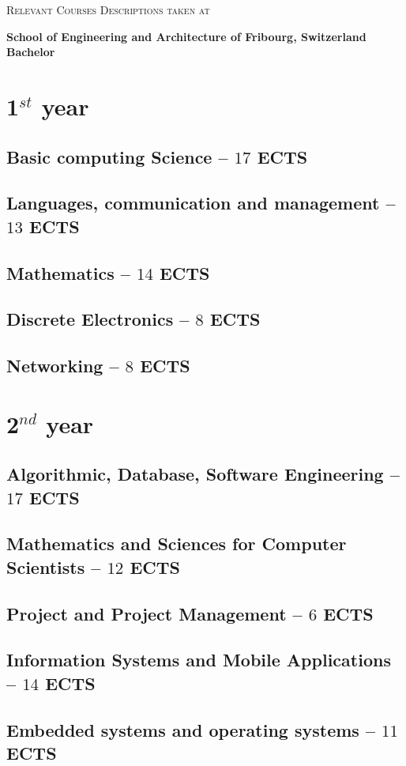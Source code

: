 \documentclass[11pt]{article}
\newcommand*{\heia}{School of Engineering and Architecture of Fribourg}
\newcommand{\module}[2]{
    \subsection[#1]{#1 \small -- $#2$ ECTS}
}
\begin{document}
\textsc{\LARGE Relevant Courses Descriptions taken at}%
\begin{center}
    \textbf{\heia{}, Switzerland\\Bachelor}
\end{center}

\tableofcontents

%
%
\section{1$^{st}$ year}
\module{Basic computing Science}{17}
\pagebreak

\module{Languages, communication and management}{13}

\pagebreak
\module{Mathematics}{14}
\pagebreak

\pagebreak
\module{Discrete Electronics}{8}
\module{Networking}{8}


%
%
\pagebreak
\section{2$^{nd}$ year}
\module{Algorithmic, Database, Software Engineering}{17}
\pagebreak
\module{Mathematics and Sciences for Computer Scientists}{12}
\module{Project and Project Management}{6}
\module{Information Systems and Mobile Applications}{14}
\pagebreak
\pagebreak
\module{Embedded systems and operating systems}{11}
\end{document}
